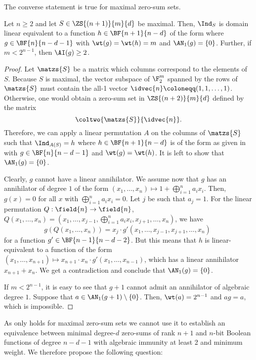 The converse statement is true for maximal zero-sum sets.

\begin{proposition}
Let $n \geq 2$ and let $S \in \ZS{(n+1)}{m}{d}$ be maximal. Then, $\Ind_S$ is domain linear equivalent to a function $h \in \BF{n+1}{n-d}$ of the form 
where $g \in \BF{n}{n-d-1}$ with $\wt(g) = \wt(h) = m$ and $\AN_1(g) = \{0\}$. Further, if $m < 2^{n-1}$, then $\AI(g) \geq 2$.
\end{proposition}
\begin{proof}
Let $\matzs{S}$ be a matrix which columns correspond to the elements of $S$. Because $S$ is maximal, the vector subspace of $\F_2^m$ spanned by the rows of $\matzs{S}$ must contain the all-1 vector $\idvec{n} \coloneqq (1,1,\dots,1)$. Otherwise, one would obtain a zero-sum set in $\ZS{(n+2)}{m}{d}$ defined by the matrix
$$
\coltwo{\matzs{S}}{\idvec{n}}.
$$
Therefore, we can apply a linear permutation $A$ on the columns of $\matzs{S}$ such that $\Ind_{A(S)} = h$ where $h \in \BF{n+1}{n-d}$ is of the form as given in  with $g \in \BF{n}{n-d-1}$ and $\wt(g) = \wt(h)$. It is left to show that $\AN_1(g) = \{0\}$. 

Clearly, $g$ cannot have a linear annihilator. We assume now that $g$ has an annihilator of degree $1$ of the form $(x_1,\dots,x_n) \mapsto 1+\bigoplus_{i=1}^{n}a_ix_i$. Then, $g(x)=0$ for all $x$ with $\bigoplus_{i=1}^{n}a_ix_i = 0$. Let $j$ be such that $a_j = 1$. For the linear permutation $Q:\field{n} \to \field{n}$, $Q(x_1, \ldots, x_{n}) = (x_1, \ldots, x_{j-1}, \bigoplus_{i=1}^{n}a_ix_i, x_{j+1}, \dots, x_{n})$, we have 
\[ g(Q(x_1,\dots,x_{n})) = x_{j}\cdot g'(x_1,\dots,x_{j-1},x_{j+1},\dots,x_{n})\;\] for a function $g' \in \BF{n-1}{n-d-2}$. But this means that $h$ is linear-equivalent to a function of the form $(x_1,\dots,x_{n+1}) \mapsto x_{n+1}\cdot x_{n}\cdot g'(x_1, \ldots, x_{n-1})$, which has a linear annihilator $x_{n+1}+x_{n}$. We get a contradiction and conclude that $\AN_1(g) = \{0\}$.

If $m < 2^{n-1}$, it is easy to see that $g+1$ cannot admit an annihilator of algebraic degree $1$. Suppose that $a \in \AN_1(g+1)\setminus \{0\}$. Then, $\wt(a) = 2^{n-1}$ and $ag = a$, which is impossible.
\end{proof}

As  only holds for maximal zero-sum sets we cannot use it to establish an equivalence between minimal degree-$d$ zero-sums of rank $n+1$ and $n$-bit Boolean functions of degree $n-d-1$ with algebraic immunity at least 2 and minimum weight. We therefore propose the following question:


